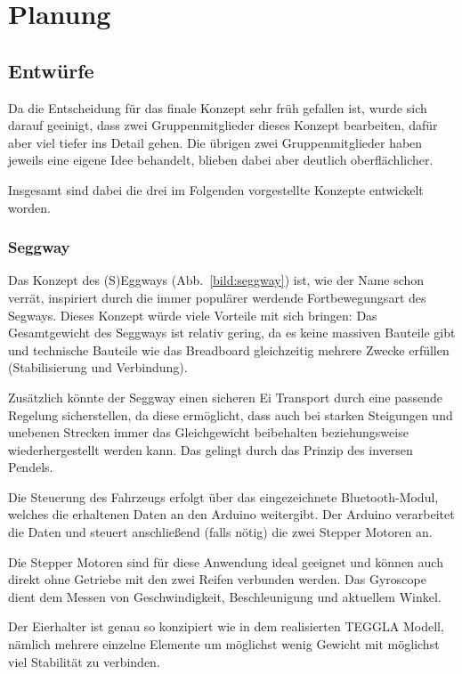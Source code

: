 \chapter{Planung}
\section{Entwürfe}
Da die Entscheidung für das finale Konzept sehr früh gefallen ist, wurde sich darauf geeinigt, dass zwei Gruppenmitglieder dieses Konzept bearbeiten, dafür aber viel tiefer ins Detail gehen. 
Die übrigen zwei Gruppenmitglieder haben jeweils eine eigene Idee behandelt, blieben dabei aber deutlich oberflächlicher. 

Insgesamt sind dabei die drei im Folgenden vorgestellte Konzepte entwickelt worden.

\subsection{Seggway}
Das Konzept des (S)Eggways (Abb.~\ref{bild:seggway}) ist, wie der Name schon verrät, inspiriert durch die immer populärer werdende Fortbewegungsart des Segways. 
Dieses Konzept würde viele Vorteile mit sich bringen: Das Gesamtgewicht des Seggways ist relativ gering, da es keine massiven Bauteile gibt und technische Bauteile wie das Breadboard gleichzeitig mehrere Zwecke erfüllen (Stabilisierung und Verbindung). 

Zusätzlich könnte der Seggway einen sicheren Ei Transport durch eine passende Regelung sicherstellen, da diese ermöglicht, dass auch bei starken Steigungen und unebenen Strecken immer das Gleichgewicht beibehalten beziehungsweise wiederhergestellt werden kann. 
Das gelingt durch das Prinzip des inversen Pendels. 

Die Steuerung des Fahrzeugs erfolgt über das eingezeichnete Bluetooth-Modul, welches die erhaltenen Daten an den Arduino weitergibt. 
Der Arduino verarbeitet die Daten und steuert anschließend (falls nötig) die zwei Stepper Motoren an. 

Die Stepper Motoren sind für diese Anwendung ideal geeignet und können auch direkt ohne Getriebe mit den zwei Reifen verbunden werden. 
Das Gyroscope dient dem Messen von Geschwindigkeit, Beschleunigung und aktuellem Winkel. 

Der Eierhalter ist genau so konzipiert wie in dem realisierten TEGGLA Modell, nämlich mehrere einzelne Elemente um möglichst wenig Gewicht mit möglichst viel Stabilität zu verbinden.

